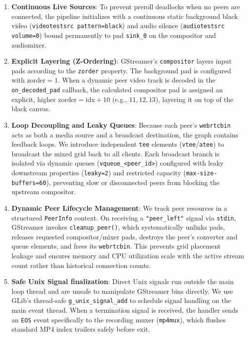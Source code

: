 \documentclass{article}
\begin{document}
\begin{enumerate}
    \item \textbf{Continuous Live Sources}: To prevent preroll deadlocks when no peers are connected,
           the pipeline initializes with a continuous static background black video (\texttt{videotestsrc pattern=black})
           and audio silence (\texttt{audiotestsrc volume=0}) bound permanently to pad \texttt{sink\_0}
           on the compositor and audiomixer.
    \item \textbf{Explicit Layering (Z-Ordering)}: GStreamer's \texttt{compositor} layers input pads
           according to the \texttt{zorder} property. The background pad is configured with $\text{zorder} = 1$.
           When a dynamic peer video track is decoded in the \texttt{on\_decoded\_pad} callback, the calculated
           compositor pad is assigned an explicit, higher $\text{zorder} = \text{idx} + 10$ (e.g., $11, 12, 13$),
           layering it on top of the black canvas.
    \item \textbf{Loop Decoupling and Leaky Queues}: Because each peer's \texttt{webrtcbin} acts as both a media
          source and a broadcast destination, the graph contains feedback loops. We introduce
          independent \texttt{tee} elements (\texttt{vtee}/\texttt{atee}) to broadcast the mixed grid back
          to all clients. Each broadcast branch is isolated via dynamic queues (\texttt{vqueue\_<peer\_id>})
          configured with leaky downstream properties (\texttt{leaky=2}) and restricted capacity
          (\texttt{max-size-buffers=60}), preventing slow or disconnected peers from blocking the upstream compositor.
    \item \textbf{Dynamic Peer Lifecycle Management}: We track peer resources in a structured \texttt{PeerInfo}
          context. On receiving a \texttt{"peer\_left"} signal via \texttt{stdin}, GStreamer
          invokes \texttt{cleanup\_peer()}, which systematically unlinks pads, releases requested
          compositor/mixer pads, destroys the peer's converter and queue elements, and frees
          its \texttt{webrtcbin}. This prevents grid placement leakage and ensures memory and
          CPU utilization scale with the active stream count rather than historical connection counts.
    \item \textbf{Safe Unix Signal finalization}: Direct Unix signals run outside the main loop
          thread and are unsafe to manipulate GStreamer bins directly. We use GLib's
          thread-safe \texttt{g\_unix\_signal\_add} to schedule signal handling on the main event thread.
          When a termination signal is received, the handler sends an \texttt{EOS} event specifically
          to the recording muxer (\texttt{mp4mux}), which flushes standard MP4 index trailers safely before exit.
\end{enumerate}
\end{document}
